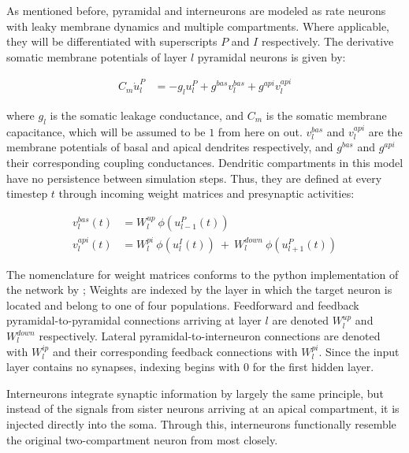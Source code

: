 As mentioned before, pyramidal and interneurons are modeled as rate neurons with leaky membrane dynamics and multiple
compartments. Where applicable, they will be differentiated with superscripts $P$ and $I$ respectively.  The derivative
somatic membrane potentials of layer $l$ pyramidal neurons is given by:

\begin{align}
  C_m \dot{u}_l^P & = - g_l u_l^{P} + g^{bas} v_l^{bas} + g^{api} v_l^{api} \label{eq-pyr-dynamics-rate}
\end{align}

where $g_l$ is the somatic leakage conductance, and $C_m$ is the somatic membrane capacitance, which will be assumed to
be $1$ from here on out. $v_l^{bas}$ and $v_l^{api}$ are the membrane potentials of basal and apical dendrites
respectively, and $g^{bas}$ and $g^{api}$ their corresponding coupling conductances.  Dendritic compartments in this
model have no persistence between simulation steps. Thus, they are defined at every timestep $t$ through incoming weight
matrices and presynaptic activities:

\begin{align}
  v_l^{bas}(t) & = W_l^{up} \ \phi(u_{l-1}^P(t)) \label{eq-v-bas-rate}                                     \\
  v_l^{api}(t) & =  W_l^{pi} \ \phi(u_l^I(t)) \ + \  W_l^{down} \ \phi(u_{l+1}^P(t)) \label{eq-v-api-rate}
\end{align}

The nomenclature for weight matrices conforms to the python implementation of the network by \cite{Haider2021}; Weights
are indexed by the layer in which the target neuron is located and belong to one of four populations. Feedforward and
feedback pyramidal-to-pyramidal connections arriving at layer $l$ are denoted $W_l^{up}$ and $W_l^{down}$ respectively.
Lateral pyramidal-to-interneuron connections are denoted with $W_l^{ip}$ and their corresponding feedback connections
with $W_l^{pi}$. Since the input layer contains no synapses, indexing begins with $0$ for the first hidden layer.
\newline

Interneurons integrate synaptic information by largely the same principle, but instead of the signals from
sister neurons arriving at an apical compartment, it is injected directly into the soma. Through this, interneurons
functionally resemble the original two-compartment neuron from \cite{urbanczik2014learning} most closely.

